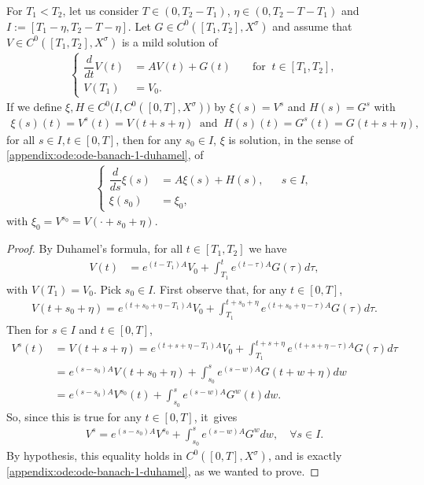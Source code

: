 \begin{lemma}\label{lmtranslat}
For $T_1<T_2$, let us consider $T\in (0, T_2-T_1)$, $\eta\in (0, T_2-T-T_1)$ and $I:=[T_1-\eta, T_2-T-\eta]$. Let $G\in C^{0}([T_{1},T_{2}],X^{\sigma})$ and assume that $V\in C^{0}([T_{1},T_{2}],X^{\sigma})$ is a mild solution of
\begin{align*}
\left\{\begin{aligned}
\dfrac{d}{dt}V(t)&=A V(t)+G(t) &&\text{ for }\ t\in [T_1, T_2],\\
V(T_1)&=V_0. &
\end{aligned}\right.
\end{align*}
If we define $\xi,H\in C^{0}\bigl(I, C^{0}([0,T],X^{\sigma})\bigr)$ by $\xi(s)=V^s$ and $H(s)=G^s$ with
\begin{align*}
\xi(s)(t)=V^{s}(t)=V(t+s+\eta)\ \text{ and }\ H(s)(t)=G^{s}(t)=G(t+s+\eta),
\end{align*}
for all $s\in I, t\in [0,T]$, then for any $s_0\in I$, $\xi$ is solution, in the sense of \eqref{appendix:ode:ode-banach-1-duhamel}, of
\begin{align*}
\left\{\begin{aligned}
\dfrac{d}{ds}\xi(s)&=A \xi(s)+H(s), && s\in I, \\
\xi(s_0)&=\xi_0, &
\end{aligned}\right.
\end{align*}
with $\xi_0=V^{s_0}=V(\cdot+s_0+\eta)$.
\end{lemma}
\begin{proof}
By Duhamel's formula, for all $t\in [T_1, T_2]$ we have
\begin{align*}
V(t)&=e^{(t-T_1)A}V_{0}+\int_{T_1}^{t}e^{(t-\tau)A}G(\tau)d\tau,
\end{align*}
with $V(T_1)=V_0$. Pick $s_0\in I$. First observe that, for any $t\in [0, T]$,
\begin{align*}
V(t+s_0+\eta)=e^{(t+s_0+\eta-T_1)A}V_{0}+\int_{T_1}^{t+s_0+\eta}e^{(t+s_0+\eta-\tau)A}G(\tau)d\tau.
\end{align*}
Then for $s\in I$ and $t\in [0, T]$,
\begin{align*}
V^{s}(t)&=V(t+s+\eta)=e^{(t+s+\eta-T_1)A}V_{0}+\int_{T_1}^{t+s+\eta}e^{(t+s+\eta-\tau)A}G(\tau)d\tau\\
&=e^{(s-s_0)A}V(t+s_0+\eta)+\int_{s_0}^{s}e^{(s-w)A}G(t+w+\eta)dw\\
&=e^{(s-s_0)A}V^{s_0}(t)+\int_{s_0}^{s}e^{(s-w)A}G^{w}(t)dw.
\end{align*}
So, since this is true for any $t\in [0,T]$, it~gives
\begin{align*}
V^{s}=e^{(s-s_0)A}V^{s_0}+\int_{s_0}^{s}e^{(s-w)A}G^{w}dw,\quad \forall s\in I.
\end{align*}
By hypothesis, this equality holds in $C^0([0, T], X^\sigma)$, and is exactly \eqref{appendix:ode:ode-banach-1-duhamel}, as we wanted to prove.
\end{proof}
